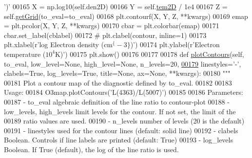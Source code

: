 \begin{DoxyCode}
       \textcolor{stringliteral}{')'}
00165         X = np.log10(self.den2D)
00166         Y = self.\hyperlink{classpyneb_1_1core_1_1emis_grid_1_1_emis_grid_ae1904aecb62ca67772b3998cca09fabd}{tem2D} / 1e4
00167         Z = self.\hyperlink{classpyneb_1_1core_1_1emis_grid_1_1_emis_grid_af9a9219e5ddfcfd53c52466e2c2deb44}{getGrid}(to\_eval=to\_eval)
00168         plt.contourf(X, Y, Z, **kwargs)
00169         emap = plt.pcolor(X, Y, Z, **kwargs)
00170         cbar = plt.colorbar(emap)
00171         cbar.set\_label(cblabel)
00172         \textcolor{comment}{# plt.clabel(contour, inline=1)}
00173         plt.xlabel(\textcolor{stringliteral}{r'log Electron density (cm$^\{-3\}$)'})
00174         plt.ylabel(\textcolor{stringliteral}{r'Electron temperature ($10^4$K)'})
00175         plt.show()
00176 
00177 
00178     \textcolor{keyword}{def }\hyperlink{classpyneb_1_1core_1_1emis_grid_1_1_emis_grid_ad9b2a66903f1b2e6b711c7d6dbe37dba}{plotContours}(self, to\_eval, low\_level=None, high\_level=None, n\_levels=20,
\hypertarget{emis_grid_8py_source_l00179}{}\hyperlink{classpyneb_1_1core_1_1emis_grid_1_1_emis_grid_ad9b2a66903f1b2e6b711c7d6dbe37dba}{00179}                       linestyles=\textcolor{stringliteral}{'-'}, clabels=\textcolor{keyword}{True}, log\_levels=\textcolor{keyword}{True}, title=\textcolor{keywordtype}{None}, ax=\textcolor{keywordtype}{None}, **kwargs):
00180         \textcolor{stringliteral}{"""}
00181 \textcolor{stringliteral}{        Plot a contour map of the diagnostic defined by to\_eval.}
00182 \textcolor{stringliteral}{        }
00183 \textcolor{stringliteral}{        Usage:}
00184 \textcolor{stringliteral}{            O3map.plotContours('L(4363)/L(5007)')}
00185 \textcolor{stringliteral}{        }
00186 \textcolor{stringliteral}{        Parameters:}
00187 \textcolor{stringliteral}{            - to\_eval                   algebraic definition of the line ratio to contour-plot}
00188 \textcolor{stringliteral}{            - low\_levels, high\_levels   limit levels for the contour. If not set, the limit of the }
00189 \textcolor{stringliteral}{                                        ratio values are used.}
00190 \textcolor{stringliteral}{            - n\_levels                  number of levels (20 is the default)}
00191 \textcolor{stringliteral}{            - linestyles                used for the contour lines (default: solid line)}
00192 \textcolor{stringliteral}{            - clabels                   Boolean. Controls if line labels are printed (default: True)}
00193 \textcolor{stringliteral}{            - log\_levels                Boolean. If True (default), the log of the line ratio is used.}

\end{DoxyCode}
